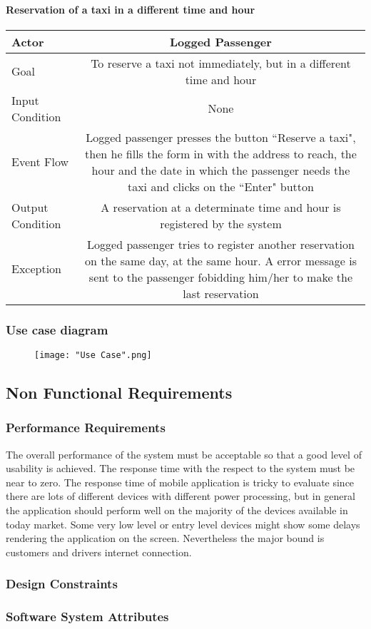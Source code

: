\documentclass[a4paper,12pt]{article}%
\newcommand{\usecasetable}[6]{
\begin{center}
\begin{tabularx}{\textwidth}{|s|C|}
\hline
Actor & #1\\
\hline
Goal & #2\\
\hline
Input Condition & #3 \\
\hline
Event Flow & #4\\
\hline
Output Condition & #5\\
\hline
Exception & #6\\
\hline
\end{tabularx}
\end{center}
}
\begin{document}
\paragraph{Reservation of a taxi in a different time and hour}
\usecasetable {Logged Passenger}{To reserve a taxi not immediately, but in a different time and hour}{None}{Logged passenger presses the button ``Reserve a taxi", then he fills the form in with the address to reach, the hour and the date in which the passenger needs the taxi and clicks on the ``Enter" button}{A reservation at a determinate time and hour is registered by the system}{Logged passenger tries to register another reservation on the same day, at the same hour. A error message is sent to the passenger fobidding him/her to make the last reservation}

\subsubsection{Use case diagram}
\begin{figure}
\texttt{[image: "Use Case".png]}
\end{figure}

\pagebreak
\subsection{Non Functional Requirements}
\subsubsection{Performance Requirements}
The overall performance of the system must be acceptable so that a good level of usability is achieved.
The response time with the respect to the system must be near to zero. The response time of mobile application is tricky to evaluate since there are lots of different devices with different power processing, but  in general the application should perform well on the majority of the devices available in today market. Some very low level or entry level devices might show some delays rendering the application on the screen. Nevertheless the major bound is customers and drivers internet connection. 
\subsubsection{Design Constraints}
\subsubsection{Software System Attributes}
\end{document}
